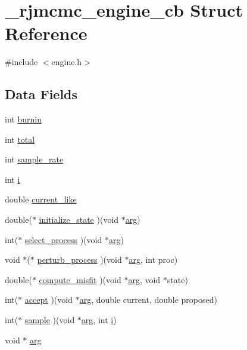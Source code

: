\hypertarget{struct__rjmcmc__engine__cb}{}\section{\+\_\+rjmcmc\+\_\+engine\+\_\+cb Struct Reference}
\label{struct__rjmcmc__engine__cb}


{\ttfamily \#include $<$engine.\+h$>$}

\subsection*{Data Fields}
\begin{DoxyCompactItemize}
\item 
int \hyperlink{struct__rjmcmc__engine__cb_acb9dcf3f03f16c4a1f6386ec0f1831d8}{burnin}
\item 
int \hyperlink{struct__rjmcmc__engine__cb_afda7df3424642cf0066ff9682784f9ea}{total}
\item 
int \hyperlink{struct__rjmcmc__engine__cb_a777c71c86acd53370442841472c24ef1}{sample\+\_\+rate}
\item 
int \hyperlink{struct__rjmcmc__engine__cb_af0051d723354a538f33b9c245b2426c3}{i}
\item 
double \hyperlink{struct__rjmcmc__engine__cb_a78debea197d5739a1e1851764dc360d8}{current\+\_\+like}
\item 
double($\ast$ \hyperlink{struct__rjmcmc__engine__cb_a57db290226797053fee2f8af0577aaa6}{initialize\+\_\+state} )(void $\ast$\hyperlink{struct__rjmcmc__engine__cb_aea2c810aeae4815b886e2252c9bca337}{arg})
\item 
int($\ast$ \hyperlink{struct__rjmcmc__engine__cb_a7017792797b8ce47ed670044f1bc8a0d}{select\+\_\+process} )(void $\ast$\hyperlink{struct__rjmcmc__engine__cb_aea2c810aeae4815b886e2252c9bca337}{arg})
\item 
void $\ast$($\ast$ \hyperlink{struct__rjmcmc__engine__cb_a69d829afbd1ad49c4bcc17727d5d8a67}{perturb\+\_\+process} )(void $\ast$\hyperlink{struct__rjmcmc__engine__cb_aea2c810aeae4815b886e2252c9bca337}{arg}, int proc)
\item 
double($\ast$ \hyperlink{struct__rjmcmc__engine__cb_ad3f49710b8fbbe3214fb9bc834ab2d6a}{compute\+\_\+misfit} )(void $\ast$\hyperlink{struct__rjmcmc__engine__cb_aea2c810aeae4815b886e2252c9bca337}{arg}, void $\ast$state)
\item 
int($\ast$ \hyperlink{struct__rjmcmc__engine__cb_ab76b8decf72beb07f5cbd5354873c075}{accept} )(void $\ast$\hyperlink{struct__rjmcmc__engine__cb_aea2c810aeae4815b886e2252c9bca337}{arg}, double current, double proposed)
\item 
int($\ast$ \hyperlink{struct__rjmcmc__engine__cb_a6a85b9af744cef99827ea3cc7aebfa3b}{sample} )(void $\ast$\hyperlink{struct__rjmcmc__engine__cb_aea2c810aeae4815b886e2252c9bca337}{arg}, int \hyperlink{struct__rjmcmc__engine__cb_af0051d723354a538f33b9c245b2426c3}{i})
\item 
void $\ast$ \hyperlink{struct__rjmcmc__engine__cb_aea2c810aeae4815b886e2252c9bca337}{arg}
\end{DoxyCompactItemize}



